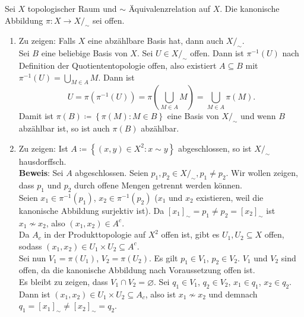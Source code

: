 \begin{problem*}[4]
  Sei $ X $ topologischer Raum und $ \sim $ Äquivalenzrelation auf $ X $. Die kanonische Abbildung $ \pi : X \to X/_\sim $ sei offen.
  \begin{enumerate}
    \item Zu zeigen: Falls $ X $ eine abzählbare Basis hat, dann auch $ X/_\sim $. \\
      Sei $ B $ eine beliebige Basis von $ X $. Sei $ U \in X/_\sim $ offen. Dann ist $ \pi^{-1}(U) $ nach Definition der Quotiententopologie offen, also existiert $ A \subseteq B $ mit $ \pi^{-1}(U) = \bigcup_{M \in A}M $. Dann ist
      \begin{equation*}
        U = \pi(\pi^{-1}(U)) = \pi\left( \bigcup_{M \in A} M \right) = \bigcup_{M \in A}\pi(M)\text{.}
      \end{equation*}
      Damit ist $ \pi(B) \coloneqq \left\{ \pi(M) : M \in B \right\} $ eine Basis von $ X/_\sim $ und wenn $ B $ abzählbar ist, so ist auch $ \pi(B) $ abzählbar.
    \item Zu zeigen: Ist $ A \coloneqq \left\{ (x,y) \in X^2 : x \sim y \right\} $ abgeschlossen, so ist $ X/_\sim $ hausdorffsch. \\
    \textbf{Beweis}: Sei $ A $ abgeschlossen. Seien $ p_1, p_2 \in X/_\sim, p_1 \neq p_2 $. Wir wollen zeigen, dass $ p_1 $ und $ p_2 $ durch offene Mengen getrennt werden können. \\
    Seien $ x_1 \in \pi^{-1}(p_1) $, $ x_2 \in \pi^{-1}(p_2) $ ($ x_1 $ und $ x_2 $ existieren, weil die kanonische Abbildung surjektiv ist). Da $ [x_1]_\sim = p_1 \neq p_2 = [x_2]_\sim $ ist $ x_1 \not \sim x_2 $, also $ (x_1, x_2) \in A^c $. \\
    Da $ A_c $ in der Produkttopologie auf $ X^2 $ offen ist, gibt es $ U_1, U_2 \subseteq X $ offen, sodass $ (x_1, x_2) \in U_1 \times U_2 \subseteq A^c $. \\
    Sei nun $ V_1 = \pi(U_1) $, $ V_2 = \pi(U_2) $. Es gilt $ p_1 \in V_1 $, $ p_2 \in V_2 $. $ V_1 $ und $ V_2 $ sind offen, da die kanonische Abbildung nach Voraussetzung offen ist. \\
    Es bleibt zu zeigen, dass $ V_1 \cap V_2 = \varnothing $. Sei $ q_1 \in V_1 $, $ q_2 \in V_2 $, $ x_1 \in q_1 $, $ x_2 \in q_2 $. Dann ist $ (x_1, x_2) \in U_1 \times U_2 \subseteq A_c $, also ist $ x_1 \not \sim x_2 $ und demnach $ q_1 = [x_1]_\sim \neq [x_2]_\sim = q_2 $.
  \end{enumerate}
\end{problem*}
% 
\newpage
